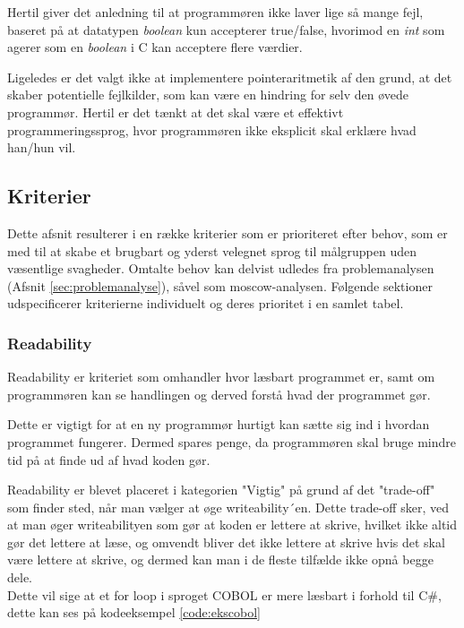 Hertil giver det anledning til at programmøren ikke laver lige så mange fejl, baseret på at datatypen \textit{boolean} kun accepterer true/false, hvorimod en \textit{int} som agerer som en \textit{boolean} i C kan acceptere flere værdier.

Ligeledes er det valgt ikke at implementere pointeraritmetik af den grund, at det skaber potentielle fejlkilder, som kan være en hindring for selv den øvede programmør. Hertil er det tænkt at det skal være et effektivt programmeringssprog, hvor programmøren ikke eksplicit skal erklære hvad han/hun vil.

\subsection{Kriterier}
Dette afsnit resulterer i en række kriterier som er prioriteret efter behov, som er med til at skabe et brugbart og yderst velegnet sprog til målgruppen uden væsentlige svagheder. Omtalte behov kan delvist udledes fra problemanalysen (Afsnit \ref{sec:problemanalyse}), såvel som \gls{moscow}-analysen.
Følgende sektioner udspecificerer kriterierne individuelt og deres prioritet i en samlet tabel.\\

\subsubsection*{Readability} Readability er kriteriet som omhandler hvor læsbart programmet er, samt om programmøren kan se handlingen og derved forstå hvad der programmet gør.

Dette er vigtigt for at en ny programmør hurtigt kan sætte sig ind i hvordan programmet fungerer. Dermed spares penge, da programmøren skal bruge mindre tid på at finde ud af hvad koden gør. 

Readability er blevet placeret i kategorien "Vigtig" på grund af det "trade-off" som finder sted, når man vælger at øge writeability´en.
Dette trade-off sker, ved at man øger writeabilityen som gør at koden er lettere at skrive, hvilket ikke altid gør det lettere at læse, og omvendt bliver det ikke lettere at skrive hvis det skal være lettere at skrive, og dermed kan man i de fleste tilfælde ikke opnå begge dele.
\\
Dette vil sige at et for loop i sproget COBOL er mere læsbart i forhold til C\#, dette kan ses på kodeeksempel \ref{code:ekscobol}


